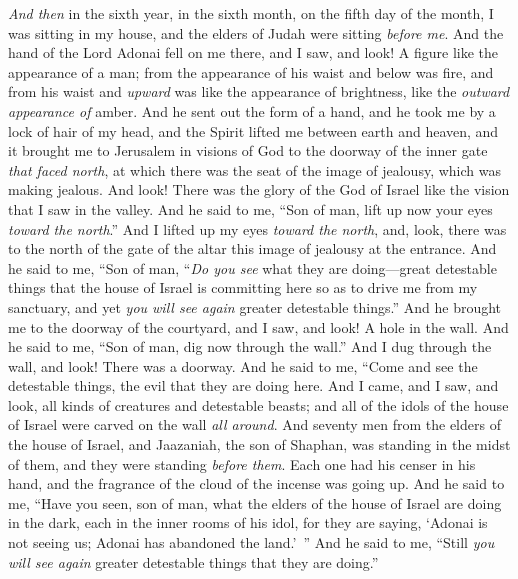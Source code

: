 \begin{biblechapter} %
 \textit{And then} in the sixth year, in the sixth month, on the fifth day of the month, I was sitting in my house, and the elders of Judah were sitting \textit{before me}. And the hand of the Lord Adonai fell on me there,
\verse and I saw, and look! A figure like the appearance of a man; from the appearance of his waist and below was fire, and from his waist and \textit{upward} was like the appearance of brightness, like the \textit{outward appearance of} amber.
\verse And he sent out the form of a hand, and he took me by a lock of hair of my head, and the Spirit lifted me between earth and heaven, and it brought me to Jerusalem in visions of God to the doorway of the inner gate \textit{that faced north}, at which there was the seat of the image of jealousy, which was making jealous.
\verse And look! There was the glory of the God of Israel like the vision that I saw in the valley.
\verse And he said to me, “Son of man, lift up now your eyes \textit{toward the north}.” And I lifted up my eyes \textit{toward the north}, and, look, there was to the north of the gate of the altar this image of jealousy at the entrance.
\verse And he said to me, “Son of man, “\textit{Do you see} what they are doing—great detestable things that the house of Israel is committing here so as to drive me from my sanctuary, and yet \textit{you will see again} greater detestable things.”
\verse And he brought me to the doorway of the courtyard, and I saw, and look! A hole in the wall.
\verse And he said to me, “Son of man, dig now through the wall.” And I dug through the wall, and look! There was a doorway.
\verse And he said to me, “Come and see the detestable things, the evil that they are doing here.
\verse And I came, and I saw, and look, all kinds of creatures and detestable beasts; and all of the idols of the house of Israel were carved on the wall \textit{all around}.
\verse And seventy men from the elders of the house of Israel, and Jaazaniah, the son of Shaphan, was standing in the midst of them, and they were standing \textit{before them}. Each one had his censer in his hand, and the fragrance of the cloud of the incense was going up.
\verse And he said to me, “Have you seen, son of man, what the elders of the house of Israel are doing in the dark, each in the inner rooms of his idol, for they are saying, ‘Adonai is not seeing us; Adonai has abandoned the land.’ ”
\verse And he said to me, “Still \textit{you will see again} greater detestable things that they are doing.”

\end{biblechapter}
